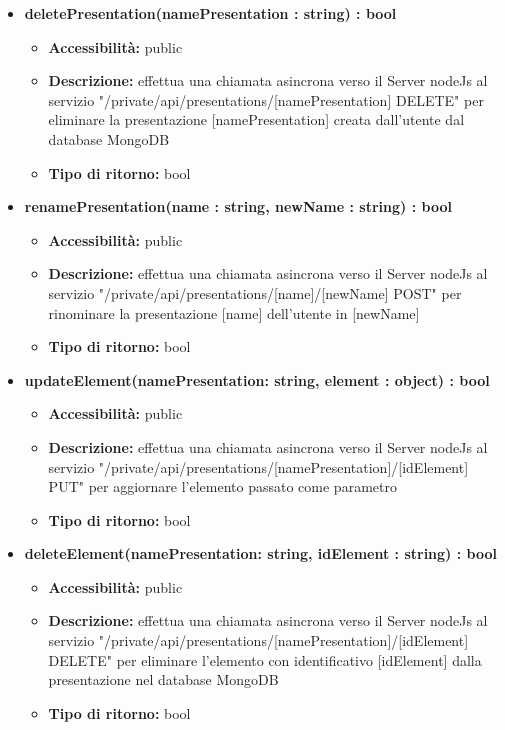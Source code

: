 {{\begin{itemize}
		\item \textbf{deletePresentation(namePresentation : string) : bool}
			\begin{itemize}
			\item \textbf{Accessibilit\`{a}:} public
			\item \textbf{Descrizione:} effettua una chiamata asincrona verso il Server nodeJs al servizio "/private/api/presentations/[namePresentation] DELETE" per eliminare la presentazione [namePresentation] creata dall'utente dal database MongoDB
			\item \textbf{Tipo di ritorno:} bool
			\end{itemize}
			
		\item \textbf{renamePresentation(name : string, newName : string) : bool}
			\begin{itemize}
			\item \textbf{Accessibilit\`{a}:} public
			\item \textbf{Descrizione:} effettua una chiamata asincrona verso il Server nodeJs al servizio "/private/api/presentations/[name]/[newName] POST" per rinominare la presentazione [name] dell'utente in [newName] 
			\item \textbf{Tipo di ritorno:} bool
			\end{itemize}
			
		\item \textbf{updateElement(namePresentation: string, element : object) : bool}
			\begin{itemize}
			\item \textbf{Accessibilit\`{a}:} public
			\item \textbf{Descrizione:} effettua una chiamata asincrona verso il Server nodeJs al servizio "/private/api/presentations/[namePresentation]/[idElement] PUT" per aggiornare l'elemento passato come parametro
			\item \textbf{Tipo di ritorno:} bool
			\end{itemize}
			
		\item \textbf{deleteElement(namePresentation: string, idElement : string) : bool}
			\begin{itemize}
			\item \textbf{Accessibilit\`{a}:} public
			\item \textbf{Descrizione:} effettua una chiamata asincrona verso il Server nodeJs al servizio "/private/api/presentations/[namePresentation]/[idElement] DELETE" per eliminare l'elemento con identificativo [idElement] dalla presentazione nel database MongoDB
			\item \textbf{Tipo di ritorno:} bool
			\end{itemize}
			

\end{itemize}}}

